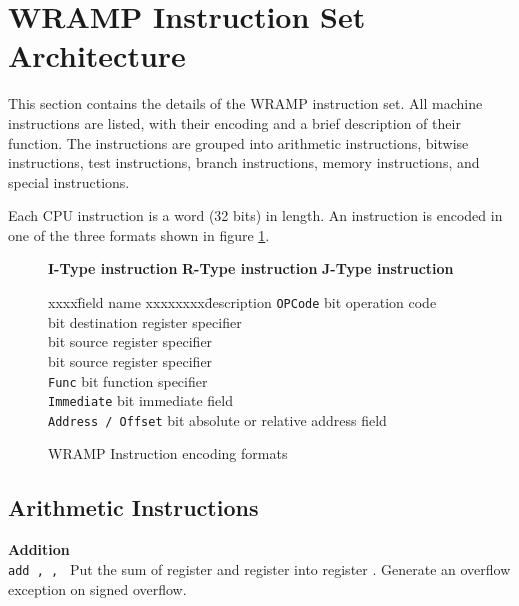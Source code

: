 \section{WRAMP Instruction Set Architecture}
\begin{small}
This section contains the details of the WRAMP instruction set.  All
machine instructions are listed, with their encoding and a brief
description of their function.  The instructions are grouped into
arithmetic instructions, bitwise instructions, test instructions,
branch instructions, memory instructions, and special instructions.

Each CPU instruction is a word (32 bits) in length. An instruction is
encoded in one of the three formats shown in figure
\ref{insn_encoding_formats}.
\end{small}

\newpage
\begin{figure}[h]
{\bf I-Type instruction}
\itypeinsnformat
{\bf R-Type instruction}
\rtypeinsnformat
{\bf J-Type instruction}
\jtypeinsnformat
\vspace{1ex}
\begin{tabbing}
xxxx\=field name xxxxxxxx\=description \kill
\>\texttt{OPCode} bit operation code\\
\>\texttt{\regd{}} bit destination register specifier\\
\>\texttt{\regs{}} bit source register specifier\\
\>\texttt{\regt{}} bit source register specifier\\
\>\texttt{Func} bit function specifier\\
\>\texttt{Immediate} bit immediate field\\
\>\texttt{Address / Offset} bit absolute or relative address field
\end{tabbing}
\caption{WRAMP Instruction encoding formats}
\label{insn_encoding_formats}
\end{figure}


\subsection{Arithmetic Instructions}
\noindent
{\bf Addition}\\
\noindent
\texttt{add \regd, \regs, \regt}
Put the sum of register \regs{} and register \regt{}
into register \regd{}. Generate an overflow exception on signed overflow.
\vspace{3ex}

